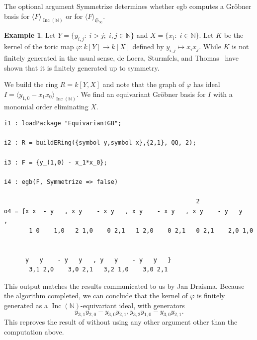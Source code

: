\documentclass[10pt]{amsart}
\theoremstyle{definition}
\newtheorem{example}[theorem]{Example}
\theoremstyle{remark}
\numberwithin{equation}{section}
\newenvironment{Macaulay2}{ \begin{spacing}{0.4} %
\smallskip } { \smallskip %
\end{spacing} }
\newcommand{\B}[1]{\mathbb #1}
\newcommand{\F}[1]{\mathfrak #1}
\newcommand{\<}{\langle}
\renewcommand{\>}{\rangle}
\newcommand{\ideal}[1]{\langle #1 \rangle}
\newcommand{\Inc}{\operatorname{Inc}(\B N)}
\begin{document}
The optional argument {\ttfamily Symmetrize} determines whether {\ttfamily egb} computes a Gr\"obner basis for $\ideal{F}_{\Inc}$ or for $\ideal{F}_{\F S_\infty}$.

\begin{example}\label{example:1}
Let $Y = \{y_{i,j}:\; i > j;\; i,j \in \B N\}$ and $X = \{x_i:\; i \in \B N\}$.  Let $K$ be the kernel of the toric map $\varphi:k[Y] \to k[X]$ defined by $y_{i,j} \mapsto x_ix_j$. While $K$ is not finitely generated in the usual sense, de Loera, Sturmfels, and Thomas~\cite{deLoera-Sturmfels-Thomas} have shown that it is finitely generated up to symmetry.

We build the ring $R = k[Y,X]$ and note that the graph of $\varphi$ has ideal $I = \ideal{y_{1,0} - x_1x_0}_{\Inc}$.  We find an equivariant Gr\"obner basis for $I$ with a monomial order eliminating $X$.
\begin{Macaulay2}
\begin{verbatim}
i1 : loadPackage "EquivariantGB";

i2 : R = buildERing({symbol y,symbol x},{2,1}, QQ, 2);

i3 : F = {y_(1,0) - x_1*x_0};

i4 : egb(F, Symmetrize => false)

                                                      2
o4 = {x x  - y   , x y    - x y   , x y    - x y   , x y    - y   y   ,
       1 0    1,0   2 1,0    0 2,1   1 2,0    0 2,1   0 2,1    2,0 1,0


      y   y    - y   y   , y   y    - y   y   }
       3,1 2,0    3,0 2,1   3,2 1,0    3,0 2,1

\end{verbatim}
\end{Macaulay2}
This output matches the results communicated to us by Jan Draisma.
Because the algorithm completed, we can conclude that the kernel of $\varphi$ is finitely generated as a $\Inc$-equivariant ideal, with generators
\[ y_{3,1}y_{2,0} - y_{3,0}y_{2,1}, y_{3,2}y_{1,0} - y_{3,0}y_{2,1}. \]
This reproves the result of \cite{deLoera-Sturmfels-Thomas} without using any other argument other than the computation above.
\end{example}
\end{document}
